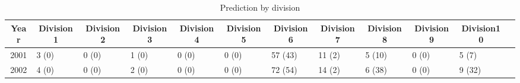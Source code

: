 \documentclass[12pt,letterpaper]{article}
\begin{document}
\begin{table}[h!]
	\centering
	\scriptsize
	\caption{Prediction by division}
	\begin{threeparttable}
		\begin{tabular}{clllllllllll}
			\toprule
			Year  & \multicolumn{1}{c}{Division1} & \multicolumn{1}{c}{Division2} & \multicolumn{1}{c}{Division3} & \multicolumn{1}{c}{Division4} & \multicolumn{1}{c}{Division5} & \multicolumn{1}{c}{Division6} & \multicolumn{1}{c}{Division7} & \multicolumn{1}{c}{Division8} & \multicolumn{1}{c}{Division9} & \multicolumn{1}{c}{Division10} \\
			\midrule
        2001  & 3\tnote{1} (0)\tnote{2} & 0 (0) & 1 (0) & 0 (0) & 0 (0) & 57 (43) & 11 (2) & 5 (10) & 0 (0) & 5 (7) \\
        2002  & 4 (0) & 0 (0) & 2 (0) & 0 (0) & 0 (0) & 72 (54) & 14 (2) & 6 (38) & 0 (0) & 9 (32) \\

\end{tabular}
\end{threeparttable}
\end{table}
\end{document}
